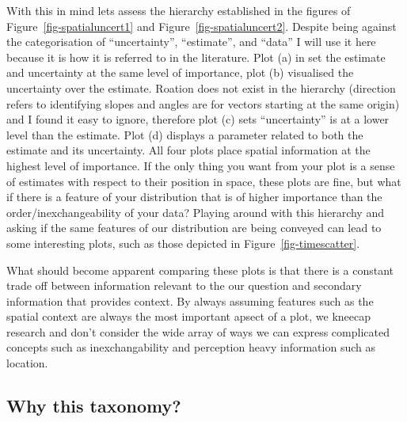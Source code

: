 \documentclass[
  letterpaper,
  DIV=11,
  numbers=noendperiod]{scrartcl}
\begin{document}
With this in mind lets assess the hierarchy established in the figures
of Figure~\ref{fig-spatialuncert1} and Figure~\ref{fig-spatialuncert2}.
Despite being against the categorisation of ``uncertainty'',
``estimate'', and ``data'' I will use it here because it is how it is
referred to in the literature. Plot (a) in set the estimate and
uncertainty at the same level of importance, plot (b) visualised the
uncertainty over the estimate. Roation does not exist in the hierarchy
(direction refers to identifying slopes and angles are for vectors
starting at the same origin) and I found it easy to ignore, therefore
plot (c) sets ``uncertainty'' is at a lower level than the estimate.
Plot (d) displays a parameter related to both the estimate and its
uncertainty. All four plots place spatial information at the highest
level of importance. If the only thing you want from your plot is a
sense of estimates with respect to their position in space, these plots
are fine, but what if there is a feature of your distribution that is of
higher importance than the order/inexchangeability of your data? Playing
around with this hierarchy and asking if the same features of our
distribution are being conveyed can lead to some interesting plots, such
as those depicted in Figure~\ref{fig-timescatter}.

What should become apparent comparing these plots is that there is a
constant trade off between information relevant to the our question and
secondary information that provides context. By always assuming features
such as the spatial context are always the most important apsect of a
plot, we kneecap research and don't consider the wide array of ways we
can express complicated concepts such as inexchangability and perception
heavy information such as location.

\hypertarget{why-this-taxonomy}{%
\subsection{Why this taxonomy?}\label{why-this-taxonomy}}
\end{document}

